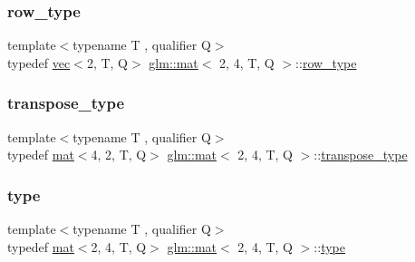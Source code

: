 \mbox{\label{structglm_1_1mat_3_012_00_014_00_01_t_00_01_q_01_4_af7681d37f1454b1e18754262a65eb6d1}} 
\subsubsection{\texorpdfstring{row\+\_\+type}{row\_type}}
{\footnotesize\ttfamily template$<$typename T , qualifier Q$>$ \\
typedef \hyperlink{structglm_1_1vec}{vec}$<$2, T, Q$>$ \hyperlink{structglm_1_1mat}{glm\+::mat}$<$ 2, 4, T, Q $>$\+::\hyperlink{structglm_1_1mat_3_012_00_014_00_01_t_00_01_q_01_4_af7681d37f1454b1e18754262a65eb6d1}{row\+\_\+type}}

\mbox{\label{structglm_1_1mat_3_012_00_014_00_01_t_00_01_q_01_4_a5030a7f34454a6871ed17c1b27cc0929}} 
\subsubsection{\texorpdfstring{transpose\+\_\+type}{transpose\_type}}
{\footnotesize\ttfamily template$<$typename T , qualifier Q$>$ \\
typedef \hyperlink{structglm_1_1mat}{mat}$<$4, 2, T, Q$>$ \hyperlink{structglm_1_1mat}{glm\+::mat}$<$ 2, 4, T, Q $>$\+::\hyperlink{structglm_1_1mat_3_012_00_014_00_01_t_00_01_q_01_4_a5030a7f34454a6871ed17c1b27cc0929}{transpose\+\_\+type}}

\mbox{\label{structglm_1_1mat_3_012_00_014_00_01_t_00_01_q_01_4_a04c04d7f08549f03063d04bca3a76ae5}} 
\subsubsection{\texorpdfstring{type}{type}}
{\footnotesize\ttfamily template$<$typename T , qualifier Q$>$ \\
typedef \hyperlink{structglm_1_1mat}{mat}$<$2, 4, T, Q$>$ \hyperlink{structglm_1_1mat}{glm\+::mat}$<$ 2, 4, T, Q $>$\+::\hyperlink{structglm_1_1mat_3_012_00_014_00_01_t_00_01_q_01_4_a04c04d7f08549f03063d04bca3a76ae5}{type}}

